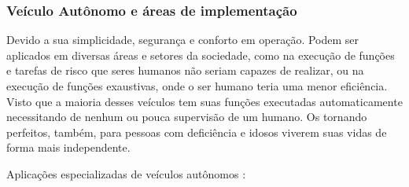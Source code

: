 \subsubsection{Veículo Autônomo e áreas de implementação} \label{implementacao}

Devido a sua simplicidade, segurança e conforto em operação. Podem ser aplicados em diversas áreas e setores da sociedade, como na execução de funções e tarefas de risco que  seres humanos não seriam capazes de realizar, ou na execução de funções exaustivas, onde o ser humano teria uma menor eficiência. Visto que a maioria desses veículos  tem suas funções executadas automaticamente necessitando de nenhum ou pouca supervisão de um humano. 
Os tornando perfeitos, também, para pessoas com deficiência e idosos viverem suas vidas de forma mais independente. 
\vspace {1cm}

Aplicações especializadas de veículos autônomos \cite{aplicacao2}:

